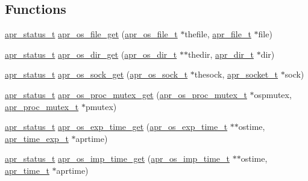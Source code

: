 \subsection*{Functions}
\begin{DoxyCompactItemize}
\item 
\hyperlink{group__apr__errno_gaf76ee4543247e9fb3f3546203e590a6c}{apr\+\_\+status\+\_\+t} \hyperlink{group__apr__portabile_ga1ff9a9a7313954fb6590f280d2c2e992}{apr\+\_\+os\+\_\+file\+\_\+get} (\hyperlink{group__apr__portabile_ga885491b889a4a719549650d3a370fd34}{apr\+\_\+os\+\_\+file\+\_\+t} $\ast$thefile, \hyperlink{group__apr__file__io_gaa46e4763ac375ea3c7a43ba6f6099e22}{apr\+\_\+file\+\_\+t} $\ast$file)
\item 
\hyperlink{group__apr__errno_gaf76ee4543247e9fb3f3546203e590a6c}{apr\+\_\+status\+\_\+t} \hyperlink{group__apr__portabile_ga99225bfab137069b9d5c5a72f863c577}{apr\+\_\+os\+\_\+dir\+\_\+get} (\hyperlink{group__apr__portabile_gacb790646cfc3da1b43a5f7c4bfaa3937}{apr\+\_\+os\+\_\+dir\+\_\+t} $\ast$$\ast$thedir, \hyperlink{group__apr__file__info_ga92ed8cf52cba2abb42cf74087aa74da8}{apr\+\_\+dir\+\_\+t} $\ast$dir)
\item 
\hyperlink{group__apr__errno_gaf76ee4543247e9fb3f3546203e590a6c}{apr\+\_\+status\+\_\+t} \hyperlink{group__apr__portabile_ga07ec79bbb5243596933cd2caf2d428df}{apr\+\_\+os\+\_\+sock\+\_\+get} (\hyperlink{group__apr__portabile_ga2965cd2e48cb6513bc0ba05aa6083ed7}{apr\+\_\+os\+\_\+sock\+\_\+t} $\ast$thesock, \hyperlink{group__apr__network__io_ga49262b223e7434746e1f1737659aa2c3}{apr\+\_\+socket\+\_\+t} $\ast$sock)
\item 
\hyperlink{group__apr__errno_gaf76ee4543247e9fb3f3546203e590a6c}{apr\+\_\+status\+\_\+t} \hyperlink{group__apr__portabile_ga2003a3142f05675696268053b2fddbe1}{apr\+\_\+os\+\_\+proc\+\_\+mutex\+\_\+get} (\hyperlink{structapr__os__proc__mutex__t}{apr\+\_\+os\+\_\+proc\+\_\+mutex\+\_\+t} $\ast$ospmutex, \hyperlink{group__apr__proc__mutex_ga0fae3a1ab686cd1f252c6062e4c97bd2}{apr\+\_\+proc\+\_\+mutex\+\_\+t} $\ast$pmutex)
\item 
\hyperlink{group__apr__errno_gaf76ee4543247e9fb3f3546203e590a6c}{apr\+\_\+status\+\_\+t} \hyperlink{group__apr__portabile_ga903df49f8cd2bb7298cb1612ff6394df}{apr\+\_\+os\+\_\+exp\+\_\+time\+\_\+get} (\hyperlink{group__apr__portabile_ga0fa9349212690591b09a0cbea7b61bdd}{apr\+\_\+os\+\_\+exp\+\_\+time\+\_\+t} $\ast$$\ast$ostime, \hyperlink{structapr__time__exp__t}{apr\+\_\+time\+\_\+exp\+\_\+t} $\ast$aprtime)
\item 
\hyperlink{group__apr__errno_gaf76ee4543247e9fb3f3546203e590a6c}{apr\+\_\+status\+\_\+t} \hyperlink{group__apr__portabile_ga406db611360a70360bec953cd92d2df7}{apr\+\_\+os\+\_\+imp\+\_\+time\+\_\+get} (\hyperlink{group__apr__portabile_ga6d27e476300cd1d3fda24e1ff0e358e1}{apr\+\_\+os\+\_\+imp\+\_\+time\+\_\+t} $\ast$$\ast$ostime, \hyperlink{group__apr__time_gadb4bde16055748190eae190c55aa02bb}{apr\+\_\+time\+\_\+t} $\ast$aprtime)
$$
\end{DoxyCompactItemize}

